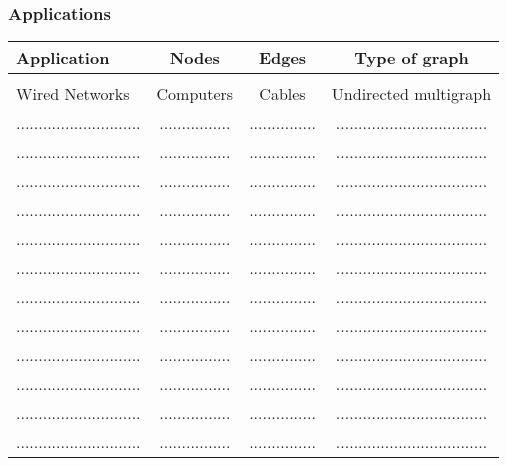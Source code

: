    \begin{frame}[fragile]
\frametitle{Applications}

\begin{tabular}{lccc}
Application & Nodes & Edges & Type of graph \\
\hline \\
Wired Networks & Computers & Cables & Undirected multigraph \\
............................ & ................ & ............... & ..................................\\
............................ & ................ & ............... & ..................................\\
............................ & ................ & ............... & ..................................\\
............................ & ................ & ............... & ..................................\\
............................ & ................ & ............... & ..................................\\
............................ & ................ & ............... & ..................................\\
............................ & ................ & ............... & ..................................\\
............................ & ................ & ............... & ..................................\\
............................ & ................ & ............... & ..................................\\
............................ & ................ & ............... & ..................................\\
............................ & ................ & ............... & ..................................\\
............................ & ................ & ............... & ..................................
\end{tabular}

\end{frame}

